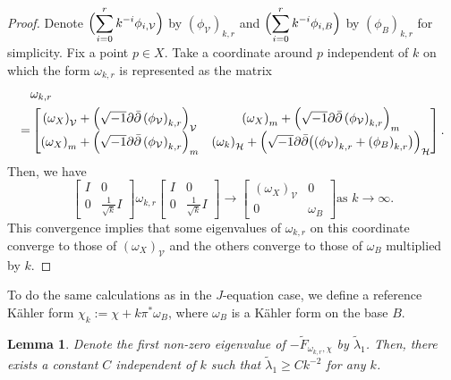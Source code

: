 \documentclass{amsart}
\numberwithin{equation}{section}
\theoremstyle{plain}
\newtheorem{lemma}[equation]{Lemma}
\theoremstyle{definition}
\theoremstyle{remark}
\begin{document}
\begin{proof}
    Denote $\Bigl( \displaystyle\sum_{i=0}^r k^{-i} \phi_{i, \mathcal{V}} \Bigr)$ by $\left( \phi_\mathcal{V} \right)_{k,r}$ and 
    $\Bigl( \displaystyle\sum_{i=0}^r k^{-i} \phi_{i, B} \Bigr)$ by $\left( \phi_B \right)_{k,r}$ for simplicity. Fix a point $p\in X$. Take a coordinate around $p$ independent of $k$ on which the form $\omega_{k,r}$ is represented as the matrix
    \begin{align*}
    &{\omega_{k,r}} \\ 
    = &\begin{bmatrix}
    \left( \omega_X \right)_\mathcal{V} + \Bigl(\sqrt{-1} \partial \bar{\partial} \left( \phi_\mathcal{V} \right)_{k,r}\Bigr)_\mathcal{V}
    & \left(\omega_X\right)_m+\Bigl(\sqrt{-1} \partial \bar{\partial} \left( \phi_\mathcal{V} \right)_{k,r}\Bigr)_m  \\
    \left(\omega_X\right)_m+\Bigl(\sqrt{-1} \partial \bar{\partial} \left( \phi_\mathcal{V} \right)_{k,r}\Bigr)_m
    & \left( \omega_k \right)_\mathcal{H}+ \Bigl(\sqrt{-1} \partial \bar{\partial} \bigl(\left( \phi_\mathcal{V} \right)_{k,r} + \left( \phi_B \right)_{k,r} \bigr)\Bigr)_\mathcal{H}
\end{bmatrix}.
\end{align*}  
Then, we have
$$\begin{bmatrix}
    I & 0 \\ 0 & \frac{1}{\sqrt{k}}I
\end{bmatrix}
\omega_{k,r}
\begin{bmatrix}
    I & 0 \\ 0 & \frac{1}{\sqrt{k}}I
\end{bmatrix} \rightarrow 
\begin{bmatrix}
    (\omega_X)_\mathcal{V} & 0 \\ 0 & \omega_B
\end{bmatrix} \text{as $k \rightarrow \infty$}.$$
This convergence implies that some eigenvalues of $\omega_{k,r}$ on this coordinate converge to those of $(\omega_X)_\mathcal{V}$ and the others converge to those of $\omega_B$ multiplied by $k$.
\end{proof}

To do the same calculations as in the $J$-equation case, we define a reference K{\"a}hler form $\chi_k:=\chi+k\pi^*\omega_B$, where $\omega_B$ is a K{\"a}hler form on the base $B$.

\begin{lemma}
    Denote the first non-zero eigenvalue of $-\tilde{F}_{\omega_{k,r},\chi}$ by $\tilde{\lambda}_1$. Then, there exists a constant $C$ independent of $k$ such that $\tilde{\lambda}_1\ge Ck^{-2}$ for any $k$.
\end{lemma}
\end{document}
